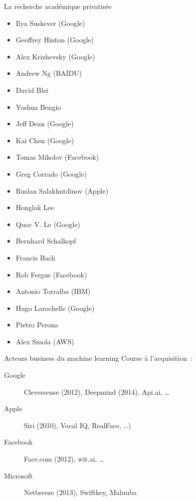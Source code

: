 \begin{frame}{La recherche académique privatisée}
  \begin{minipage}{0.49\linewidth}   
    \begin{itemize}
      \item Ilya Suskever (Google)
      \item Geoffrey Hinton (Google)
      \item Alex Krizhevsky (Google)
      \item Andrew Ng (BAIDU)
      \item David Blei
      \item Yoshua Bengio 
      \item Jeff Dean (Google)
      \item Kai Chen (Google)
      \item Tomas Mikolov (Facebook)
      \item Greg Corrado (Google)
    \end{itemize}
  \end{minipage}
  \begin{minipage}{0.49\linewidth}
    \begin{itemize}
      \item Ruslan Salakhutdinov (Apple)
      \item Honglak Lee
      \item Quoc V. Le (Google)
      \item Bernhard Schalkopf
      \item Francis Bach
      \item Rob Fergus (Facebook)
      \item Antonio Torralba (IBM)
      \item Hugo Larochelle (Google)
      \item Pietro Perona
      \item Alex Smola (AWS)
    \end{itemize}  
  \end{minipage}
\end{frame}

\begin{frame}{Acteurs business du machine learning}
  Course à l'acquisition~:
  \begin{description}
    \item[Google] Cleversense (2012), Deepmind (2014), Api.ai, …
    \item[Apple] Siri (2010), Vocal IQ, RealFace, …)
    \item[Facebook] Face.com (2012), wit.ai, …
    \item[Microsoft] Netbreeze (2013), Swiftkey, Maluuba
    \end{description}
\end{frame}

